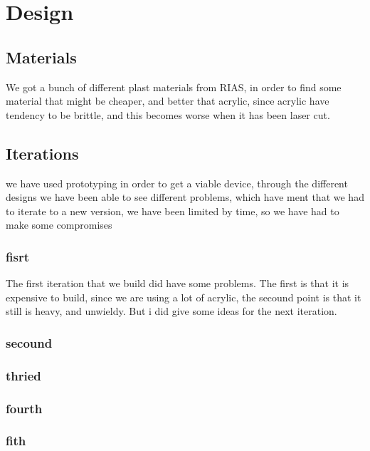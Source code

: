 \section{Design}
\subsection{Materials}
We got a bunch of different plast materials from RIAS, in order to find some material that might be cheaper, and better that acrylic, since acrylic have tendency to be brittle, and this becomes worse when it has been laser cut. 

\subsection{Iterations}
we have used prototyping in order to get a viable device, through the different designs we have been able to see different problems, which have ment that we had to iterate to a new version, we have been limited by time, so we have had to make some compromises

\subsubsection{fisrt}
The first iteration that we build did have some problems.
The first is that it is expensive to build, since we are using a lot of acrylic, the secound point is that it still is heavy, and unwieldy.
But i did give some ideas for the next iteration.

\subsubsection{secound}


\subsubsection{thried}


\subsubsection{fourth}


\subsubsection{fith}


